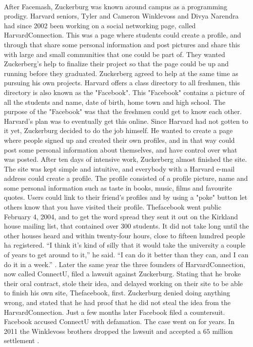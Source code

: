 \paragraph{}
After Facemash, Zuckerburg was known around campus as a programming prodigy. Harvard seniors, Tyler and Cameron Winklevoss and Divya Narendra had since 2002 been working on a social networking page, called HarvardConnection. This was a page where students could create a profile, and through that share some personal information and post pictures and share this with large and small communities that one could be part of. They wanted Zuckerberg's help to finalize their project so that the page could be up and running before they graduated. Zuckerberg agreed to help at the same time as pursuing his own projects. Harvard offers a class directory to all freshmen, this directory is also known as the "Facebook". This "Facebook" contains a picture of all the students and name, date of birth, home town and high school. The purpose of the "Facebook" was that the freshmen could get to know each other. Harvard's plan was to eventually get this online. Since Harvard had not gotten to it yet,  Zuckerburg decided to do the job himself. He wanted to create a page where people signed up and created their own profiles, and in that way could post some personal information about themselves, and have control over what was posted. After ten days of intensive work, Zuckerberg almost finished the site. The site was kept simple and intuitive, and everybody with a Harvard e-mail address could create a profile. The profile consisted of a profile picture, name and some personal information such as taste in books, music, films and favourite quotes. Users could link to their friend's profiles and by using a "poke" button let others know that you have visited their profile. Thefacebook went public February 4, 2004, and to get the word spread they sent it out on the Kirkland house mailing list, that contained over 300 students. It did not take long until the other houses heard and within twenty-four hours, close to fifteen hundred people ha registered. “I think it’s kind of silly that it would take the university a couple of years to get around to it,” he said. “I can do it better than they can, and I can do it in a week.” \cite{MeMedia}. Later the same year the three founders of HarvardConnection, now called ConnectU, filed a lawsuit against Zuckerburg. Stating that he broke their oral contract, stole their idea, and delayed working on their site to be able to finish his own site, Thefacebook, first. Zuckerburg denied doing anything wrong, and stated that he had proof that he did not steal the idea from the HarvardConnection. Just a few months later Facebook filed a countersuit. Facebook accused ConnectU with defamation. The case went on for years. In 2011 the Winklevoss brothers dropped the lawsuit and accepted a $ 65 $ million settlement \cite{droppLawsuit}.

